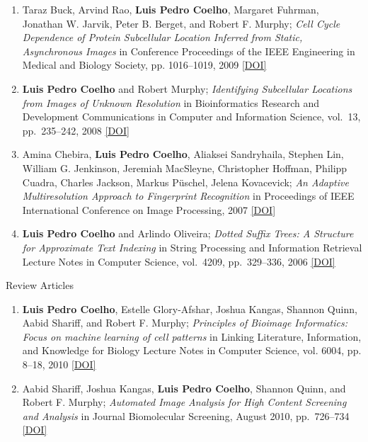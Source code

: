 \documentclass{article}
\renewcommand\subsection[1]{%
    \par\vspace{.1em}%
    {\hspace{1em}\subsubhead #1}%
    \par\vspace{.2em}%
}
\newcommand\showdoi[1]{%
    \href{http://dx.doi.org/#1}{[DOI]}%
}
\begin{document}
\begin{enumerate}
\item Taraz Buck, Arvind Rao, \textbf{Luis Pedro Coelho}, Margaret Fuhrman,
Jonathan W. Jarvik, Peter B. Berget, and Robert F. Murphy; \emph{Cell Cycle
Dependence of Protein Subcellular Location Inferred from Static, Asynchronous
Images} in Conference Proceedings of the IEEE Engineering in Medical and
Biology Society, pp. 1016--1019, 2009 \showdoi{10.1109/IEMBS.2009.5332888}

\item \textbf{Luis Pedro Coelho} and Robert Murphy; \emph{Identifying
Subcellular Locations from Images of Unknown Resolution} in Bioinformatics
Research and Development Communications in Computer and Information Science,
vol.\ 13, pp.\ 235--242, 2008 \showdoi{10.1007/978-3-540-70600-7_18}

\item Amina Chebira, \textbf{Luis Pedro Coelho}, Aliaksei Sandryhaila, Stephen
Lin, William G. Jenkinson, Jeremiah MacSleyne, Christopher Hoffman, Philipp
Cuadra, Charles Jackson, Markus Püschel, Jelena Kovacevick; \emph{An Adaptive
Multiresolution Approach to Fingerprint Recognition} in Proceedings of IEEE
International Conference on Image Processing, 2007
\showdoi{10.1109/ICIP.2007.4378990}

\item \textbf{Luis Pedro Coelho} and Arlindo Oliveira; \emph{Dotted Suffix
Trees: A Structure for Approximate Text Indexing} in String Processing and
Information Retrieval Lecture Notes in Computer Science, vol.\ 4209, pp.\
329--336, 2006 \showdoi{10.1007/11880561_27}
\end{enumerate}

\subsection{Review Articles}
\begin{enumerate}
\item \textbf{Luis Pedro Coelho}, Estelle Glory-Afshar, Joshua Kangas, Shannon
Quinn, Aabid Shariff, and Robert F. Murphy; \emph{Principles of Bioimage
Informatics: Focus on machine learning of cell patterns} in Linking Literature,
Information, and Knowledge for Biology Lecture Notes in Computer Science, vol.
6004, pp. 8--18, 2010 \showdoi{10.1007/978-3-642-13131-8_2}

\item Aabid Shariff, Joshua Kangas, \textbf{Luis Pedro Coelho}, Shannon Quinn,
and Robert F. Murphy; \emph{Automated Image Analysis for High Content Screening
and Analysis} in Journal Biomolecular Screening, August 2010, pp.\ 726--734
\showdoi{10.1177/1087057110370894}
\end{enumerate}
\end{document}
